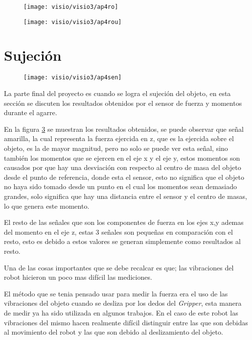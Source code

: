 \begin{figure}[h]
	\centering
	\texttt{[image: visio/visio3/ap4ro]}
	\caption{}
	\label{fig:ap4ro}
\end{figure}
\begin{figure}[h]
	\centering
	\texttt{[image: visio/visio3/ap4rou]}
	\caption{}
	\label{fig:ap4rou}
\end{figure}







\clearpage

\section{Sujeción}




\begin{figure}[h]
	\centering
	\texttt{[image: visio/visio3/ap4sen]}
	\caption{}
	\label{fig:ap4sen}
\end{figure}







La parte final del proyecto es cuando se logra el sujeción del objeto, en esta sección se discuten los resultados obtenidos por el sensor de fuerza y momentos durante el agarre.


En la figura \ref{fig:ap4sen} se muestran los resultados obtenidos, se puede observar que señal amarilla, la cual representa la fuerza ejercida en z, que es la ejercida sobre el objeto, es la de mayor magnitud, pero no solo se puede ver esta señal, sino también los momentos que se ejercen en el eje x y el eje y, estos momentos son causados por que hay una desviación con respecto al centro de masa del objeto desde el punto de referencia, donde esta el sensor, esto no significa que el objeto no haya sido tomado desde un punto en el cual los momentos sean demasiado grandes, solo significa que hay una distancia entre el sensor y el centro de masas, lo que genera este momento.

El resto de las señales que son los componentes de fuerza en los ejes x,y ademas del momento en el eje z, estas 3 señales son pequeñas en comparación con el resto, esto es debido a estos valores se generan simplemente como resultados al resto.


Una de las cosas importantes que se debe recalcar es que; las vibraciones del robot hicieron un poco mas difícil las mediciones.

El método que se tenia pensado usar para medir la fuerza era el uso de las vibraciones del objeto cuando se desliza por los dedos del \textit{Gripper}, esta manera de medir ya ha sido utilizada en algunos trabajos. En el caso de este robot las vibraciones del mismo hacen realmente difícil distinguir entre las que son debidas al movimiento del robot y las que son debido al deslizamiento del objeto.